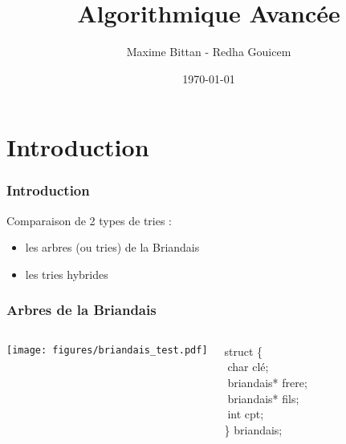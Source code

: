 \documentclass{beamer}
\title[AlgAv]{Algorithmique Avancée} %
\author{Maxime Bittan - Redha Gouicem} %
\date{\today} %
\begin{document}
\begin{frame}
\titlepage %
\end{frame}


\section{Introduction} %

\begin{frame}
\frametitle{Introduction}
Comparaison de 2 types de tries :
\begin{itemize}
  \item les arbres (ou tries) de la Briandais
  \item les tries hybrides
\end{itemize}
\end{frame}


\begin{frame}
\frametitle{Arbres de la Briandais}
\begin{columns}[c] %

\texttt{[image: figures/briandais\_test.pdf]}

struct \{\\
   $\;$char clé;\\
   $\;$briandais* frere;\\
   $\;$briandais* fils;\\
   $\;$int cpt;\\
\} briandais;

\end{columns}
\end{frame}

\end{document}
